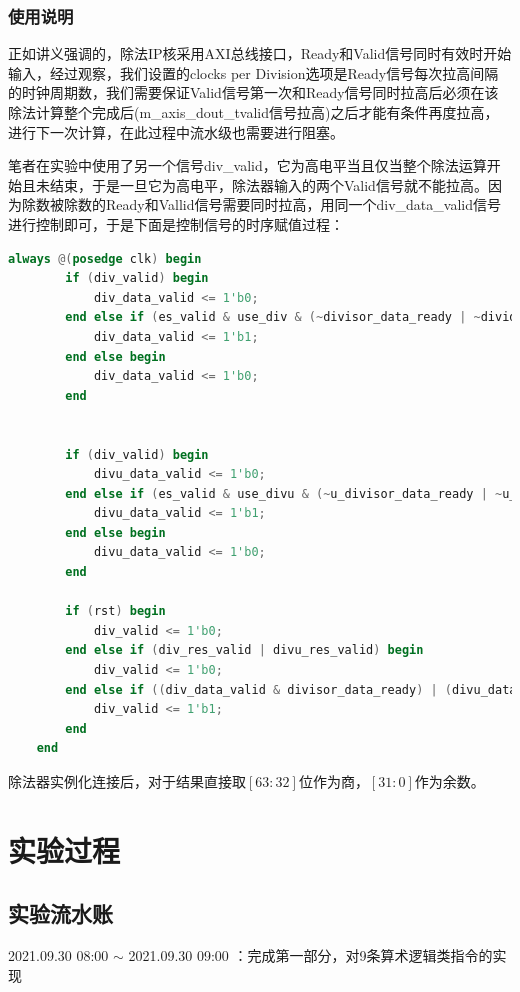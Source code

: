 \documentclass[UTF-8,twoside,c5size]{ctexart}
\begin{document}
	\subsubsection{使用说明}
	\label{Valid_input}

	正如讲义强调的，除法IP核采用AXI总线接口，Ready和Valid信号同时有效时开始输入，经过观察，我们设置的clocks per Division选项是Ready信号每次拉高间隔的时钟周期数，我们需要保证Valid信号第一次和Ready信号同时拉高后必须在该除法计算整个完成后(m\_axis\_dout\_tvalid信号拉高)之后才能有条件再度拉高，进行下一次计算，在此过程中流水级也需要进行阻塞。
	
	笔者在实验中使用了另一个信号div\_valid，它为高电平当且仅当整个除法运算开始且未结束，于是一旦它为高电平，除法器输入的两个Valid信号就不能拉高。因为除数被除数的Ready和Vallid信号需要同时拉高，用同一个div\_data\_valid信号进行控制即可，于是下面是控制信号的时序赋值过程：
	
	\begin{lstlisting}[language=verilog]
	always @(posedge clk) begin
		if (div_valid) begin
			div_data_valid <= 1'b0;
		end else if (es_valid & use_div & (~divisor_data_ready | ~dividend_data_ready)) begin
			div_data_valid <= 1'b1;
		end else begin
			div_data_valid <= 1'b0;
		end
		
		
		if (div_valid) begin
			divu_data_valid <= 1'b0;
		end else if (es_valid & use_divu & (~u_divisor_data_ready | ~u_dividend_data_ready)) begin
			divu_data_valid <= 1'b1;
		end else begin
			divu_data_valid <= 1'b0;
		end
		
		if (rst) begin
			div_valid <= 1'b0;
		end else if (div_res_valid | divu_res_valid) begin
			div_valid <= 1'b0;
		end else if ((div_data_valid & divisor_data_ready) | (divu_data_valid & u_divisor_data_ready)) begin
			div_valid <= 1'b1;
		end
	end
	\end{lstlisting}

	除法器实例化连接后，对于结果直接取$[63:32]$位作为商，$[31:0]$作为余数。
	
	\section{实验过程}
	
	\subsection{实验流水账}
	
	2021.09.30 08:00 $\sim$ 2021.09.30 09:00 ：完成第一部分，对9条算术逻辑类指令的实现
	
\end{document}
